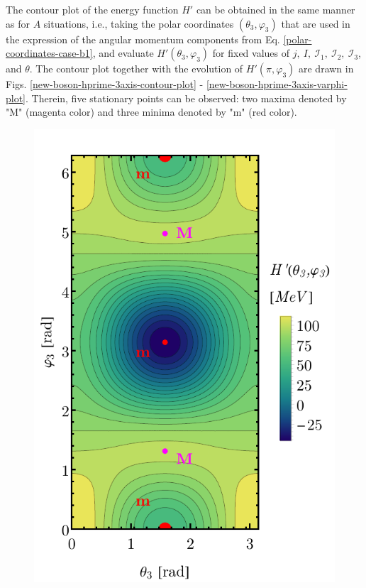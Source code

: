 The contour plot of the energy function $H'$ can be obtained in the same manner as for $A$ situations, i.e., taking the polar coordinates $(\theta_3,\varphi_3)$ that are used in the expression of the angular momentum components from Eq. \ref{polar-coordinates-case-b1}, and evaluate $H'(\theta_3,\varphi_3)$ for fixed values of $j,\ I,\ \mathcal{I}_1,\ \mathcal{I}_2,\ \mathcal{I}_3$, and $\theta$. The contour plot together with the evolution of $H'(\pi,\varphi_3)$ are drawn in Figs. \ref{new-boson-hprime-3axis-contour-plot} - \ref{new-boson-hprime-3axis-varphi-plot}. Therein, five stationary points can be observed: two maxima denoted by "M" (magenta color) and three minima denoted by "m" (red color).
\begin{figure}
    \begin{center}
        \includegraphics[scale=0.7]{Chapters/Figures/New-Boson-Classical-H-3axis-quantization.pdf}

\end{center}
\end{figure}
